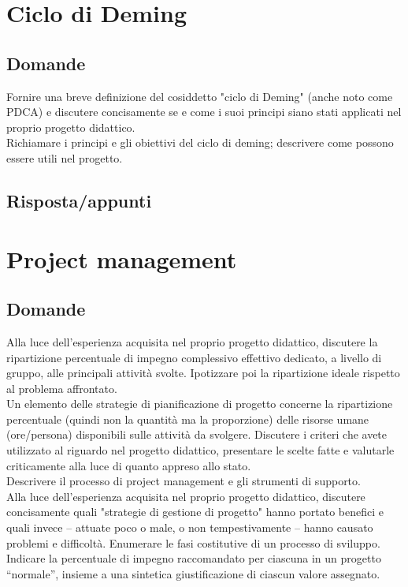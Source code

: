 \section{Ciclo di Deming}

\subsection*{Domande}
Fornire una breve definizione del cosiddetto "ciclo di Deming" (anche noto come PDCA) e discutere concisamente se e come i suoi principi siano stati applicati nel proprio progetto didattico.\\

Richiamare i principi e gli obiettivi del ciclo di deming; descrivere come possono essere utili nel progetto.

\subsection*{Risposta/appunti}


\section{Project management}

\subsection*{Domande}
Alla luce dell'esperienza acquisita nel proprio progetto didattico, discutere la ripartizione percentuale di impegno complessivo effettivo dedicato, a livello di gruppo, alle principali attività svolte. 
Ipotizzare poi la ripartizione ideale rispetto al problema affrontato.\\

Un elemento delle strategie di pianificazione di progetto concerne la ripartizione percentuale (quindi non la quantità ma la proporzione) delle risorse umane (ore/persona) disponibili sulle attività da svolgere.
Discutere i criteri che avete utilizzato al riguardo nel progetto didattico, presentare le scelte fatte e valutarle criticamente alla luce di quanto appreso allo stato. \\

Descrivere il processo di project management e gli strumenti di supporto. \\

Alla luce dell'esperienza acquisita nel proprio progetto didattico, discutere concisamente quali "strategie di gestione di progetto" hanno portato benefici e quali invece – attuate poco o male, o non tempestivamente – hanno causato problemi e difficoltà.
Enumerare le fasi costitutive di un processo di sviluppo.
Indicare la percentuale di impegno raccomandato per ciascuna in un progetto “normale”, insieme a una sintetica giustificazione di ciascun valore assegnato.

